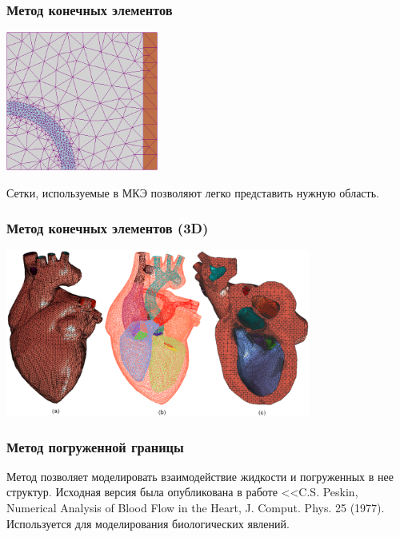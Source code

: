 \documentclass[14pt]{beamer}
\begin{document}
\begin{frame}
\frametitle{Метод конечных элементов}
    \begin{center}
        \includegraphics[width=5cm]{immersed_boundary/Example_of_2D_mesh.png}
    \end{center}
    Сетки, используемые в МКЭ позволяют легко представить нужную область.
\end{frame}

\begin{frame}
    \frametitle{Метод конечных элементов (3D)}
    \begin{center}
        \includegraphics[width=10cm]{immersed_boundary/heart_bound.png}
    \end{center}
\end{frame}

\begin{frame}
\frametitle{Метод погруженной границы}
Метод позволяет моделировать взаимодействие жидкости и погруженных в нее структур. Исходная версия была опубликована в работе <<C.S. Peskin, Numerical Analysis of Blood Flow in the Heart, J. Comput. Phys. 25 (1977). Используется для моделирования биологических явлений.
\end{frame}
\end{document}

